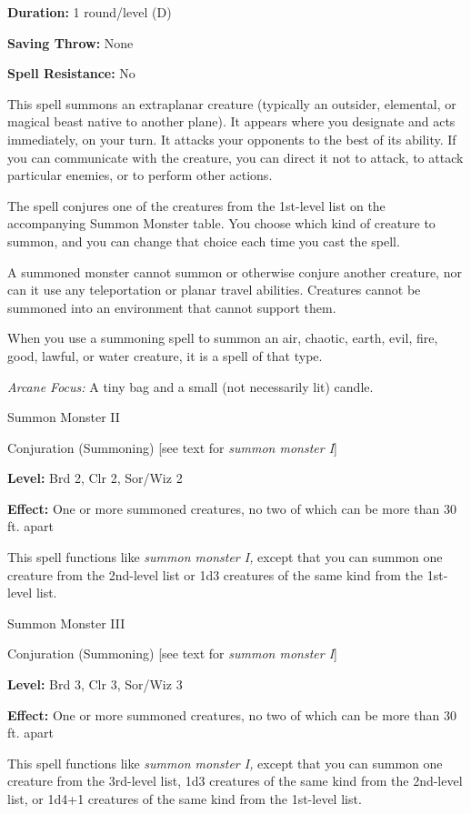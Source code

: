 \documentclass{article}
\begin{document}
\textbf{Duration:} 1 round/level (D)

\textbf{Saving Throw:} None

\textbf{Spell Resistance:} No

This spell summons an extraplanar creature (typically an outsider, elemental, or 
magical beast native to another plane). It appears where you designate and acts 
immediately, on your turn. It attacks your opponents to the best of its ability. 
If you can communicate with the creature, you can direct it not to attack, to attack 
particular enemies, or to perform other actions.

The spell conjures one of the creatures from the 1st-level list on the accompanying 
Summon Monster table. You choose which kind of creature to summon, and you can 
change that choice each time you cast the spell.

A summoned monster cannot summon or otherwise conjure another creature, nor can 
it use any teleportation or planar travel abilities. Creatures cannot be summoned 
into an environment that cannot support them.

When you use a summoning spell to summon an air, chaotic, earth, evil, fire, good, 
lawful, or water creature, it is a spell of that type.

\textit{Arcane Focus: }A tiny bag and a small (not necessarily lit) candle.

\vspace{12pt}
Summon Monster II

Conjuration (Summoning) [see text for \textit{summon monster I}]

\textbf{Level:} Brd 2, Clr 2, Sor/Wiz 2

\textbf{Effect:} One or more summoned creatures, no two of which can be more than 
30 ft. apart

This spell functions like \textit{summon monster I, }except that you can summon 
one creature from the 2nd-level list or 1d3 creatures of the same kind from the 
1st-level list.

\vspace{12pt}
Summon Monster III

Conjuration (Summoning) [see text for \textit{summon monster I}]

\textbf{Level:} Brd 3, Clr 3, Sor/Wiz 3

\textbf{Effect:} One or more summoned creatures, no two of which can be more than 
30 ft. apart

This spell functions like \textit{summon monster I, }except that you can summon 
one creature from the 3rd-level list, 1d3 creatures of the same kind from the 2nd-level 
list, or 1d4+1 creatures of the same kind from the 1st-level list.
\end{document}
